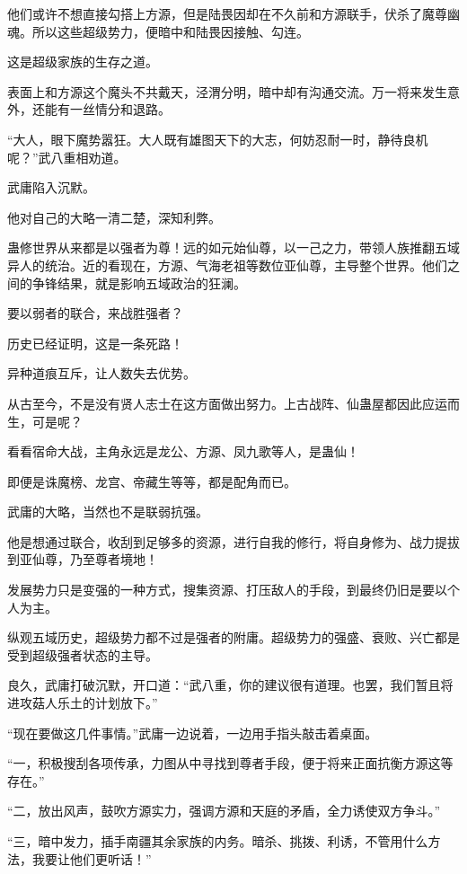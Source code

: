 \begin{this_body}
他们或许不想直接勾搭上方源，但是陆畏因却在不久前和方源联手，伏杀了魔尊幽魂。所以这些超级势力，便暗中和陆畏因接触、勾连。

这是超级家族的生存之道。

表面上和方源这个魔头不共戴天，泾渭分明，暗中却有沟通交流。万一将来发生意外，还能有一丝情分和退路。

“大人，眼下魔势嚣狂。大人既有雄图天下的大志，何妨忍耐一时，静待良机呢？”武八重相劝道。

武庸陷入沉默。

他对自己的大略一清二楚，深知利弊。

蛊修世界从来都是以强者为尊！远的如元始仙尊，以一己之力，带领人族推翻五域异人的统治。近的看现在，方源、气海老祖等数位亚仙尊，主导整个世界。他们之间的争锋结果，就是影响五域政治的狂澜。

要以弱者的联合，来战胜强者？

历史已经证明，这是一条死路！

异种道痕互斥，让人数失去优势。

从古至今，不是没有贤人志士在这方面做出努力。上古战阵、仙蛊屋都因此应运而生，可是呢？

看看宿命大战，主角永远是龙公、方源、凤九歌等人，是蛊仙！

即便是诛魔榜、龙宫、帝藏生等等，都是配角而已。

武庸的大略，当然也不是联弱抗强。

他是想通过联合，收刮到足够多的资源，进行自我的修行，将自身修为、战力提拔到亚仙尊，乃至尊者境地！

发展势力只是变强的一种方式，搜集资源、打压敌人的手段，到最终仍旧是要以个人为主。

纵观五域历史，超级势力都不过是强者的附庸。超级势力的强盛、衰败、兴亡都是受到超级强者状态的主导。

良久，武庸打破沉默，开口道：“武八重，你的建议很有道理。也罢，我们暂且将进攻菇人乐土的计划放下。”

“现在要做这几件事情。”武庸一边说着，一边用手指头敲击着桌面。

“一，积极搜刮各项传承，力图从中寻找到尊者手段，便于将来正面抗衡方源这等存在。”

“二，放出风声，鼓吹方源实力，强调方源和天庭的矛盾，全力诱使双方争斗。”

“三，暗中发力，插手南疆其余家族的内务。暗杀、挑拨、利诱，不管用什么方法，我要让他们更听话！”

\end{this_body}

